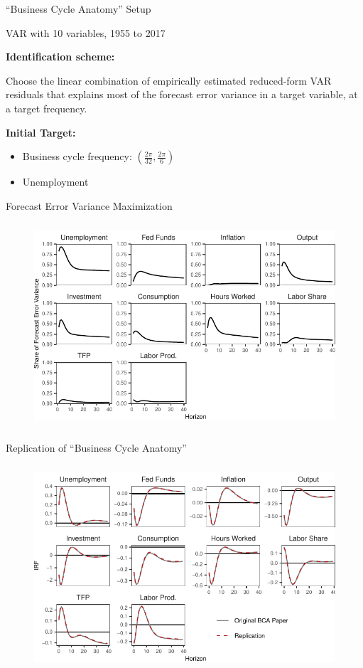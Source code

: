 \begin{frame}{``Business Cycle Anatomy'' Setup}
    
    \label{replication-slide}

    VAR with 10 variables, 1955 to 2017

    \vspace{0.5cm}

    \textbf{Identification scheme:}

    Choose the linear combination of empirically estimated reduced-form VAR residuals that explains most of the forecast error variance in a target variable, at a target frequency.

    \vspace{0.5cm}

    \textbf{Initial Target:}
    \begin{itemize}
        \item Business cycle frequency: $\left(\frac{2\pi}{32}, \frac{2\pi}{6}\right)$
        \item Unemployment
    \end{itemize}
    
    
\end{frame}


\begin{frame}{Forecast Error Variance Maximization}

    \begin{figure}
        \includegraphics[height = 3in]{figs/fig0_bca_fevd_rep.pdf}
    \end{figure}

\end{frame}


\begin{frame}{Replication of ``Business Cycle Anatomy''}

    \begin{figure}
        \includegraphics[height = 3in]{figs/fig1_bca_replication.pdf}
    \end{figure}

\end{frame}
